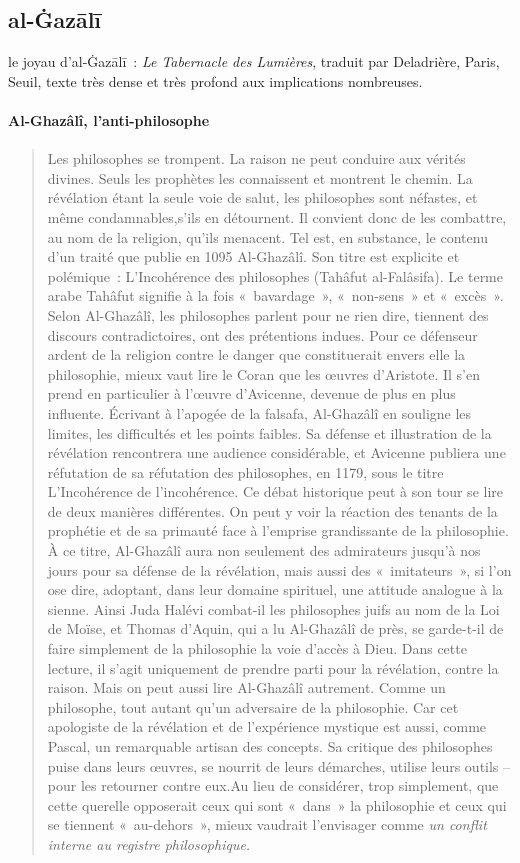\subsection{al-Ġazālī}

le joyau d'al-Ġazālī~: \emph{Le Tabernacle des Lumières}, traduit
par Deladrière, Paris, Seuil, texte très dense et très profond aux
implications nombreuses.
\paragraph{Al-Ghazâlî, l’anti-philosophe} 
\begin{quote}
Les philosophes se trompent. La raison ne peut conduire aux vérités divines. Seuls les prophètes les connaissent et montrent le chemin. La révélation étant la seule voie de salut, les philosophes sont néfastes, et même condamnables,s’ils en détournent. Il convient donc de les combattre, au nom de la religion, qu’ils menacent. Tel est, en substance, le contenu d’un traité que publie en 1095 Al-Ghazâlî. Son titre est explicite et polémique : L’Incohérence des philosophes (Tahâfut al-Falâsifa). Le terme arabe Tahâfut signifie à la fois « bavardage », « non-sens » et « excès ». Selon Al-Ghazâlî, les philosophes parlent pour ne rien dire, tiennent des discours contradictoires, ont des prétentions indues. Pour ce défenseur ardent de la religion contre le danger que constituerait envers elle la philosophie, mieux vaut lire le Coran que les œuvres d’Aristote. Il s’en prend en particulier à l’œuvre d’Avicenne, devenue de plus en plus influente. Écrivant à l’apogée de la falsafa, Al-Ghazâlî en souligne les limites, les difficultés et les points faibles. Sa défense et illustration de la révélation rencontrera une audience considérable, et Avicenne publiera une réfutation de sa réfutation des philosophes, en 1179, sous le titre L’Incohérence de l’incohérence. Ce débat historique peut à son tour se lire de deux manières différentes. On peut y voir la réaction des tenants de la prophétie et de sa primauté face à l’emprise grandissante de la philosophie. À ce titre, Al-Ghazâlî aura non seulement des admirateurs jusqu’à nos jours pour sa défense de la révélation, mais aussi des « imitateurs », si l’on ose dire, adoptant, dans leur domaine spirituel, une attitude analogue à la sienne. Ainsi Juda Halévi combat-il les philosophes juifs au nom de la Loi de Moïse, et Thomas d’Aquin, qui a lu Al-Ghazâlî de près, se garde-t-il de faire simplement de la philosophie la voie d’accès à Dieu. Dans cette lecture, il s’agit uniquement de prendre parti pour la révélation, contre la raison. Mais on peut aussi lire Al-Ghazâlî autrement. Comme un philosophe, tout autant qu’un adversaire de la philosophie. Car cet apologiste de la révélation et de l’expérience mystique est aussi, comme Pascal, un remarquable artisan des concepts. Sa critique des philosophes puise dans leurs œuvres, se nourrit de leurs démarches, utilise leurs outils – pour les retourner contre eux.Au lieu de considérer, trop simplement, que cette querelle opposerait ceux qui sont « dans » la philosophie et ceux qui se tiennent « au-dehors », mieux vaudrait l’envisager comme \emph{un conflit interne au registre philosophique.}

\end{quote}
